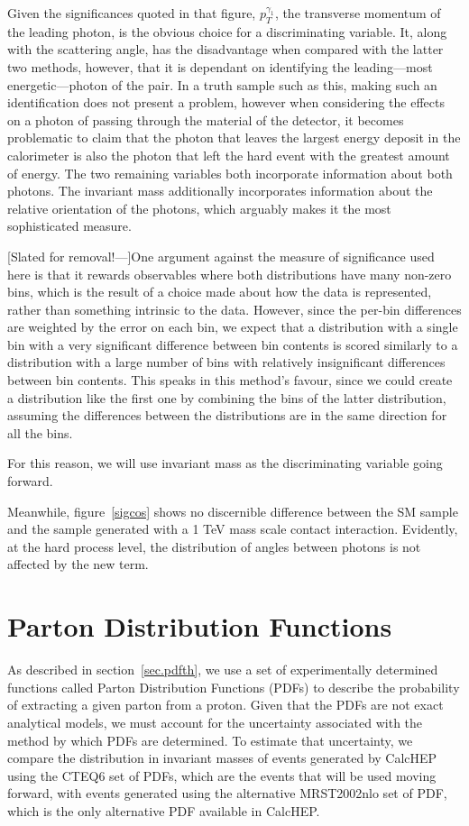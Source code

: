 Given the significances quoted in that figure, $p^{\gamma_1}_T$, the transverse momentum of the leading photon, is the obvious choice for a discriminating variable. It, along with the scattering angle, has the disadvantage when compared with the latter two methods, however, that it is dependant on identifying the leading---most energetic---photon of the pair. In a truth sample such as this, making such an identification does not present a problem, however when considering the effects on a photon of passing through the material of the detector, it becomes problematic to claim that the photon that leaves the largest energy deposit in the calorimeter is also the photon that left the hard event with the greatest amount of energy. The two remaining variables both incorporate information about both photons. The invariant mass additionally incorporates information about the relative orientation of the photons, which arguably makes it the most sophisticated measure. 

[Slated for removal!---]One argument against the measure of significance used here is that it rewards observables where both distributions have many non-zero bins, which is the result of a choice made about how the data is represented, rather than something intrinsic to the data. However, since the per-bin differences are weighted by the error on each bin, we expect that a distribution with a single bin with a very significant difference between bin contents is scored similarly to a distribution with a large number of bins with relatively insignificant differences between bin contents. This speaks in this method's favour, since we could create a distribution like the first one by combining the bins of the latter distribution, assuming the differences between the distributions are in the same direction for all the bins.

For this reason, we will use invariant mass as the discriminating variable going forward.

Meanwhile, figure~\ref{sigcos} shows no discernible difference between the SM sample and the sample generated with a 1 TeV mass scale contact interaction. Evidently, at the hard process level, the distribution of angles between photons is not affected by the new term.

\section{Parton Distribution Functions}
As described in section~\ref{sec.pdfth}, we use a set of experimentally determined functions called Parton Distribution Functions (PDFs) to describe the probability of extracting a given parton from a proton. Given that the PDFs are not exact analytical models, we must account for the uncertainty associated with the method by which  PDFs are determined. To estimate that uncertainty, we compare the distribution in invariant masses of events generated by CalcHEP using the CTEQ6 set of PDFs, which are the events that will be used moving forward, with events generated using the alternative MRST2002nlo set of PDF, which is the only alternative PDF available in CalcHEP.

